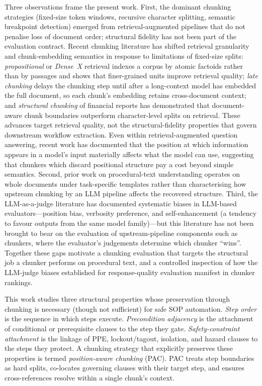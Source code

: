 \documentclass[make,article,submit,oneauthor,pdftex]{Definitions/mdpi}
\begin{document}
Three observations frame the present work. First, the dominant
chunking strategies (fixed-size token windows, recursive character
splitting, semantic breakpoint detection) emerged from
retrieval-augmented pipelines that do not penalise loss of document
order; structural fidelity has not been part of the evaluation
contract. Recent chunking literature has shifted retrieval granularity
and chunk-embedding semantics in response to limitations of fixed-size
splits: \emph{propositional} or \emph{Dense~X} retrieval indexes a
corpus by atomic factoids rather than by passages and shows that
finer-grained units improve retrieval
quality\cite{chen2024densex}; \emph{late chunking} delays the chunking
step until after a long-context model has embedded the full document,
so each chunk's embedding retains cross-document
context\cite{guenther2024latechunking}; and \emph{structural chunking}
of financial reports has demonstrated that document-aware chunk
boundaries outperform character-level splits on
retrieval\cite{jimenoyepes2024financialchunking}. These advances target
retrieval quality, not the structural-fidelity properties that govern
downstream workflow extraction. Even within retrieval-augmented
question answering, recent work has documented that the position at
which information appears in a model's input materially affects what
the model can use, suggesting that chunkers which discard positional
structure pay a cost beyond simple semantics\cite{liu2024lost}. Second, prior
work on procedural-text understanding operates on whole documents under
task-specific templates rather than characterising how upstream
chunking by an LLM pipeline affects the recovered structure. Third,
the LLM-as-a-judge literature has documented systematic biases in
LLM-based evaluators---position bias, verbosity preference, and
self-enhancement (a tendency to favour outputs from the same model
family)\cite{zheng2023judging,panickssery2024selfpref}---but this
literature has not been brought to bear on the evaluation of
upstream-pipeline components such as chunkers, where the evaluator's
judgements determine which chunker ``wins''. Together these gaps
motivate a chunking evaluation that targets the structural job a
chunker performs on procedural text, and a controlled inspection of
how the LLM-judge biases established for response-quality evaluation
manifest in chunker rankings.

This work studies three structural properties whose preservation
through chunking is necessary (though not sufficient) for safe SOP
automation. \emph{Step order} is the sequence in which steps execute.
\emph{Precondition adjacency} is the attachment of conditional or
prerequisite clauses to the step they gate. \emph{Safety-constraint
attachment} is the linkage of PPE, lockout/tagout, isolation, and
hazard clauses to the steps they protect. A chunking strategy that
explicitly preserves these properties is termed \emph{position-aware
chunking} (PAC). PAC treats step boundaries as hard splits, co-locates
governing clauses with their target step, and ensures cross-references
resolve within a single chunk's context.
\end{document}
